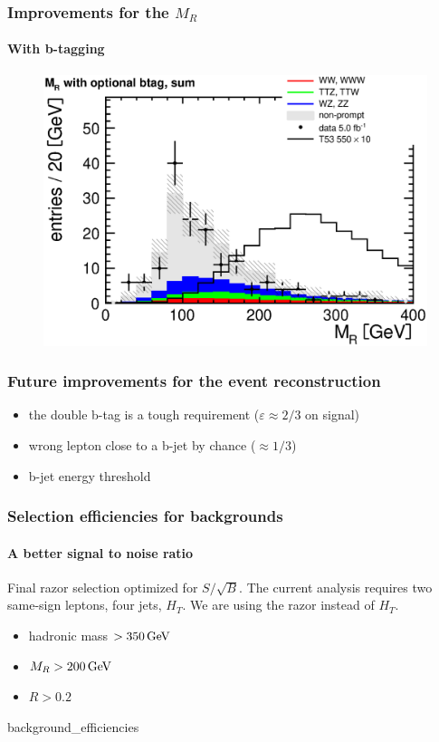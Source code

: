 \documentclass[ukenglish]{beamer}
\begin{document}
\begin{frame}
    \frametitle{Improvements for the $M_R$}
    \framesubtitle{With b-tagging}
        \begin{figure}[h!]
            \centering
                    \includegraphics[height=.8\textheight]{mr_optional_btag_sum.eps}
        \end{figure}
\end{frame}

\begin{frame}
    \frametitle{Future improvements for the event reconstruction}
    \begin{itemize}
        \item the double b-tag is a tough requirement ($\varepsilon \approx 2/3$ on signal)
        \item wrong lepton close to a b-jet by chance ($\approx 1/3$)
        \item b-jet energy threshold
    \end{itemize}
\end{frame}

\begin{frame}
    \frametitle{Selection efficiencies for backgrounds}
    \framesubtitle{A better signal to noise ratio}
    Final razor selection optimized for $S/\sqrt{B}$. The current analysis
    requires two same-sign leptons, four jets, $H_T$. We are using the razor
    instead of $H_T$.
    \begin{itemize}
        \item hadronic mass $>\unit[350]{GeV}$
        \item $M_R > \unit[200]{GeV}$
        \item $R > 0.2$
    \end{itemize}
    {background_efficiencies}
\end{frame}
\end{document}
